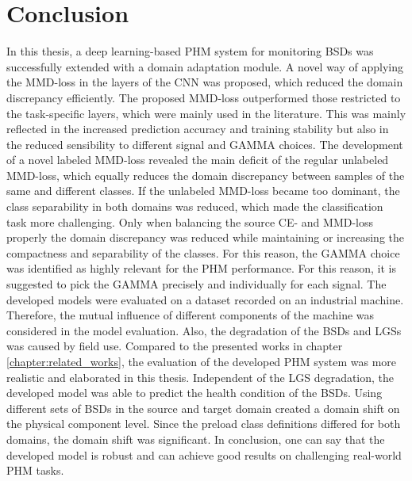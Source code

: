 \chapter{Conclusion}\label{chapter:conclusion}

In this thesis, a deep learning-based PHM system for monitoring BSDs was successfully extended with a domain adaptation module. A novel way of applying the MMD-loss in the layers of the CNN was proposed, which reduced the domain discrepancy efficiently. The proposed MMD-loss outperformed those restricted to the task-specific layers, which were mainly used in the literature. This was mainly reflected in the increased prediction accuracy and training stability but also in the reduced sensibility to different signal and GAMMA choices. The development of a novel labeled MMD-loss revealed the main deficit of the regular unlabeled MMD-loss, which equally reduces the domain discrepancy between samples of the same and different classes. If the unlabeled MMD-loss became too dominant, the class separability in both domains was reduced, which made the classification task more challenging. Only when balancing the source CE- and MMD-loss properly the domain discrepancy was reduced while maintaining or increasing the compactness and separability of the classes. For this reason, the GAMMA choice was identified as highly relevant for the PHM performance. For this reason, it is suggested to pick the GAMMA precisely and individually for each signal. The developed models were evaluated on a dataset recorded on an industrial machine. Therefore, the mutual influence of different components of the machine was considered in the model evaluation. Also, the degradation of the BSDs and LGSs was caused by field use. Compared to the presented works in chapter \ref{chapter:related_works}, the evaluation of the developed PHM system was more realistic and elaborated in this thesis. Independent of the LGS degradation, the developed model was able to predict the health condition of the BSDs. Using different sets of BSDs in the source and target domain created a domain shift on the physical component level. Since the preload class definitions differed for both domains, the domain shift was significant. In conclusion, one can say that the developed model is robust and can achieve good results on challenging real-world PHM tasks.
